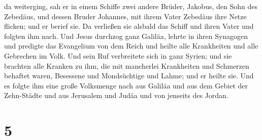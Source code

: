 da weiterging, sah er in einem Schiffe zwei andere Brüder, Jakobus, den
Sohn des Zebedäus, und dessen Bruder Johannes, mit ihrem Vater Zebedäus
ihre Netze flicken; und er berief sie.  Da verließen sie
alsbald das Schiff und ihren Vater und folgten ihm nach. 
Und Jesus durchzog ganz Galiläa, lehrte in ihren Synagogen und predigte
das Evangelium von dem Reich und heilte alle Krankheiten und alle
Gebrechen im Volk.  Und sein Ruf verbreitete sich in ganz
Syrien; und sie brachten alle Kranken zu ihm, die mit mancherlei
Krankheiten und Schmerzen behaftet waren, Besessene und Mondsüchtige und
Lahme; und er heilte sie.  Und es folgte ihm eine große
Volksmenge nach aus Galiläa und aus dem Gebiet der Zehn-Städte und aus
Jerusalem und Judäa und von jenseits des Jordan.

\hypertarget{section-4}{%
\section{5}\label{section-4}}

